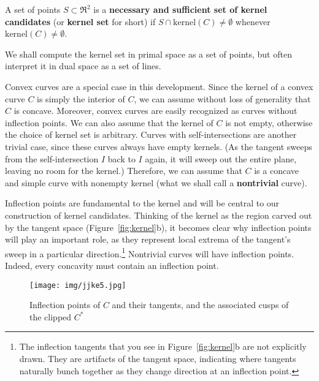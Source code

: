 \documentclass[12pt]{article}
\begin{document}
\begin{defn2}
A set of points $S \subset \Re^2$ is a 
{\bf necessary and sufficient set of kernel candidates} 
(or {\bf kernel set} for short)
if $S \cap \mbox{kernel}(C) \neq \emptyset$ 
whenever  $\mbox{kernel}(C) \neq \emptyset$.
\end{defn2}

\noindent 
We shall compute the kernel set in primal space as a set of points,
but often interpret it in dual space as a set of lines.

Convex curves are a special case in this development.
Since the kernel of a convex curve $C$ is simply the interior of $C$,
we can assume without loss of generality that $C$ is concave.
Moreover, convex curves are easily recognized as curves without inflection
points.
We can also assume that the kernel of $C$ is
not empty, otherwise the choice of kernel set is arbitrary.
Curves with self-intersections are another trivial case,
since these curves always have empty kernels.
(As the tangent sweeps from the self-intersection $I$ back to $I$ again,
it will sweep out the entire plane, leaving no room for the kernel.)
Therefore, we can assume that $C$ is a concave and
simple curve with nonempty kernel (what we shall call a {\bf nontrivial} curve).


Inflection points are fundamental to the kernel and will be central
to our construction of kernel candidates.
Thinking of the kernel as the region carved out by the tangent space (Figure~\ref{fig:kernel}b),
it becomes clear why inflection points will play an important role,
as they represent local extrema of the tangent's sweep in a particular
direction.\footnote{The inflection tangents 
	that you see in 
	Figure~\ref{fig:kernel}b are not explicitly drawn.
	They are artifacts of the tangent space, indicating where
	tangents naturally bunch together as they change direction
	at an inflection point.}
Nontrivial curves will have inflection points.
Indeed, every concavity must contain an inflection point.

\begin{figure}[h]
\begin{center}
\texttt{[image: img/jjke5.jpg]}
\end{center}
\caption{Inflection points of $C$ and their tangents, and the associated cusps of the clipped $C^*$}
\label{fig:infl}
\end{figure}
\end{document}
